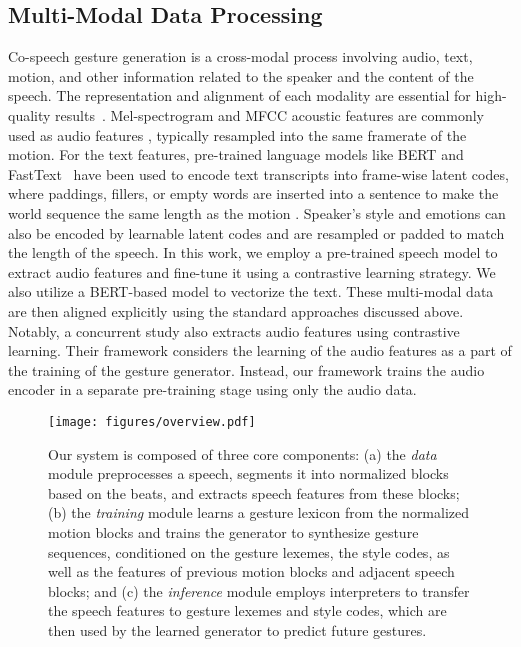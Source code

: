 \documentclass[acmtog,authorversion]{acmart}
\begin{document}
\subsection{Multi-Modal Data Processing}
Co-speech gesture generation is a cross-modal process involving audio, text, motion, and other information related to the speaker and the content of the speech. The representation and alignment of each modality are essential for high-quality results~\cite{8269806}. Mel-spectrogram and MFCC acoustic features are commonly used as audio features \cite{alexanderson2020style, qian2021speech, kucherenko2020gesticulator}, typically resampled into the same framerate of the motion. For the text features, pre-trained language models like BERT \cite{devlin2019bert,kucherenko2020gesticulator} and FastText~\cite{bojanowski2017enriching,yoon2020speech} have been used to encode text transcripts into frame-wise latent codes, where paddings, fillers, or empty words are inserted into a sentence to make the world sequence the same length as the motion \cite{kucherenko2020gesticulator, yoon2020speech}. Speaker's style and emotions can also be encoded by learnable latent codes \cite{bhattacharya2021speech2affectivegestures,yoon2020speech} and are resampled or padded to match the length of the speech. In this work, we employ a pre-trained speech model to extract audio features and fine-tune it using a contrastive learning strategy. We also utilize a BERT-based model to vectorize the text. These multi-modal data are then aligned explicitly using the standard approaches discussed above. Notably, a concurrent study \cite{liu2022learning} also extracts audio features using contrastive learning. Their framework considers the learning of the audio features as a part of the training of the gesture generator. Instead, our framework trains the audio encoder in a separate pre-training stage using only the audio data.

\begin{figure*}[t]
    \centering
    \texttt{[image: figures/overview.pdf]}
    \caption{
    Our system is composed of three core components: 
    (a) the \emph{data} module preprocesses a speech, segments it into normalized blocks based on the beats, and extracts speech features from these blocks;
    (b) the \emph{training} module learns a gesture lexicon from the normalized motion blocks and trains the generator to synthesize gesture sequences, conditioned on the gesture lexemes, the style codes, as well as the features of previous motion blocks and adjacent speech blocks;
    and (c) the \emph{inference} module employs interpreters to transfer the speech features to gesture lexemes and style codes, which are then used by the learned generator to predict future gestures.
    }
    \Description{}
    \label{fig:system_overview}
\end{figure*}
\end{document}
